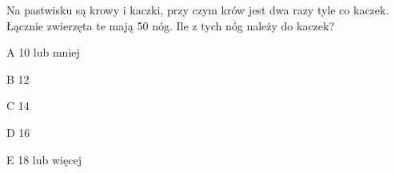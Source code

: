 \begin{tresc}
Na pastwisku są krowy i kaczki, przy czym krów jest dwa razy tyle co kaczek. Łącznie zwierzęta te mają 50 nóg. Ile z tych nóg należy do kaczek?
\end{tresc}
\begin{wariant}{A} 10 lub mniej \end{wariant}
\begin{wariant}{B} 12 \end{wariant}
\begin{wariant}{C} 14 \end{wariant}
\begin{wariant}{D} 16 \end{wariant}
\begin{wariant}{E} 18 lub więcej \end{wariant}
